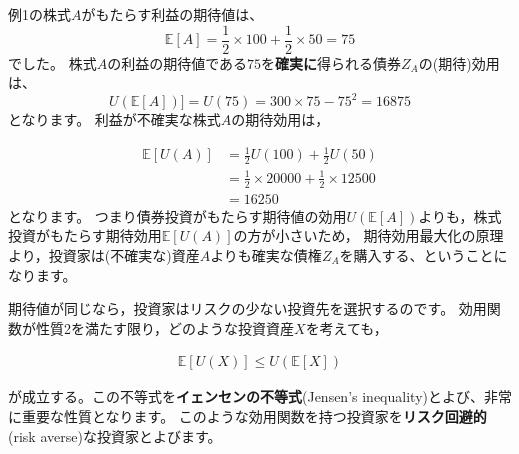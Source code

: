 \documentclass[
  letterpaper,
  pandoc,
  ja=standard,
  jafont = hiragino-pron]{ltjsbook}
\begin{document}
\begin{tcolorbox}[enhanced jigsaw, colframe=quarto-callout-warning-color-frame, breakable, rightrule=.15mm, coltitle=black, title=\textcolor{quarto-callout-warning-color}{\faExclamationTriangle}\hspace{0.5em}{例1の株式}, colbacktitle=quarto-callout-warning-color!10!white, leftrule=.75mm, colback=white, left=2mm, arc=.35mm, opacityback=0, titlerule=0mm, toptitle=1mm, bottomtitle=1mm, bottomrule=.15mm, toprule=.15mm, opacitybacktitle=0.6]

例1の株式\(A\)がもたらす利益の期待値は、 \[
\mathbb{E}[A] = \frac 12 \times 100 + \frac 12 \times 50 = 75
\] でした。
株式\(A\)の利益の期待値である\(75\)を\textbf{確実に}得られる債券\(Z_A\)の(期待)効用は、
\[
U( \mathbb{E}[A]) ] = U(75) = 300 \times 75 - 75^2 = 16875
\] となります。 利益が不確実な株式\(A\)の期待効用は，

\[
\begin{aligned}
\mathbb{E}[ U (A)] &= \frac 12 U(100) + \frac 12 U(50)\\
            &= \frac 12 \times 20000 + \frac 12 \times 12500\\
            &= 16250
\end{aligned}
\] となります。
つまり債券投資がもたらす期待値の効用\(U(\mathbb{E}[A])\)よりも，株式投資がもたらす期待効用\(\mathbb{E}[U(A)]\)の方が小さいため，
期待効用最大化の原理より，投資家は(不確実な)資産\(A\)よりも確実な債権\(Z_A\)を購入する、ということになります。

\end{tcolorbox}

期待値が同じなら，投資家はリスクの少ない投資先を選択するのです。
効用関数が性質2を満たす限り，どのような投資資産\(X\)を考えても，

\[
\begin{aligned}
\mathbb{E}[U(X)] \leq U(\mathbb{E}[X])
\end{aligned}
\]

が成立する。この不等式を\textbf{イェンセンの不等式}(Jensen's
inequality)とよび、非常に重要な性質となります。
このような効用関数を持つ投資家を\textbf{リスク回避的}(risk
averse)な投資家とよびます。
\end{document}
